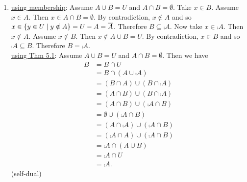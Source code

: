 \documentclass[12pt]{book}
\begin{document}
\begin{enumerate}
{\begin{enumerate}
\underline{using membership}: Assume that $A \cup B = A$ for all $A$. Then, in particular, for $A = \emptyset$ we have $A \cup B = \emptyset \cup B = \emptyset$. Take $x \in B$. Then $x \in \emptyset \cup B = \emptyset$ and so $B \subseteq \emptyset$. Now take $x \in \emptyset$. By ex falso quodlibet, we have $x \in B$. Therefore $\emptyset \subseteq B$. Thus $B = \emptyset$.\\ \underline{using Thm 5.1}: Assume that $A \cup B = A$ for all $A$. Then, in particular, $\emptyset \cup B = \emptyset$. Then \begin{align*}B &= B \cup \emptyset\tag{5.1.4}\\&= \emptyset \cup B\tag{5.1.2}\\&= \emptyset.\tag{Consequence of assumption}\end{align*} Therefore $B = \emptyset$.\\ \underline{dual proof}: Assume that $A \cap B = A$ for all $A$. Then, in particular, $U \cap B = U$. Then \begin{align*}B &= B \cap U\tag{5.1.4'}\\&= U \cap B\tag{5.1.2'}\\&= U.\tag{Consequence of assumption}\end{align*} Therefore $B = U$.
\item %
\underline{using membership}: Assume $A \cup B = U$ and $A \cap B = \emptyset$. Take $x \in B$. Assume $x \in A$. Then $x \in A \cap B = \emptyset$. By contradiction, $x \notin A$ and so $x \in \{y \in U \mid y \notin A\} = U - A = \overline{A}$. Therefore $B \subseteq \comp{A}$. Now take $x \in \comp{A}$. Then $x \notin A$. Assume $x \notin B$. Then $x \notin A \cup B = U$. By contradiction, $x \in B$ and so $\comp{A} \subseteq B$. Therefore $B = \comp{A}$.\\ 
\underline{using Thm 5.1}: Assume $A \cup B = U$ and $A \cap B = \emptyset$. Then we have \begin{align*}B &= B \cap U \tag{5.1.4'}\\&= B \cap (A \cup \comp{A})\tag{5.1.5}\\&= (B \cap A) \cup (B \cap \comp{A})\tag{5.1.3'}\\&= (A \cap B) \cup (B \cap \comp{A})\tag{5.1.2'}\\&=(A \cap B) \cup (\comp{A} \cap B)\tag{5.1.2'}\\&= \emptyset \cup (\comp{A} \cap B) \tag{Assumption}\\&= (A \cap \comp{A}) \cup (\comp{A} \cap B)\tag{5.1.5'}\\&= (\comp{A} \cap A) \cup (\comp{A} \cap B)\tag{5.1.2'}\\&= \comp{A} \cap (A \cup B)\tag{5.1.3'}\\&= \comp{A} \cap U\tag{Assumption}\\&= \comp{A}.\tag{5.1.4'}\end{align*}(self-dual)

\end{enumerate}}
\end{enumerate}
\end{document}
